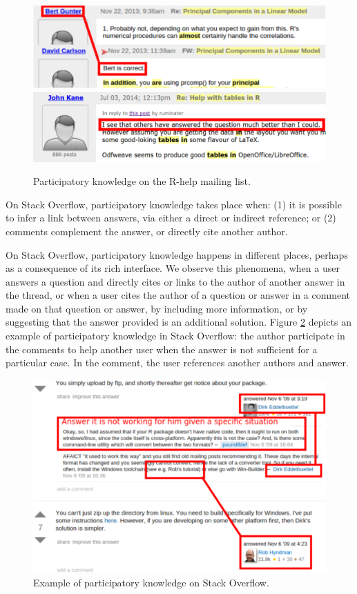 \documentclass{sig-alternate-05-2015}
\begin{document}
	
	\begin{figure}[!htb]
		\centering
		\includegraphics[width=\columnwidth]{Figures/ML-PKimg2}
		\includegraphics[width=\columnwidth]{Figures/ML-PKimg11}
		\caption[Participatory knowledge on the R-help mailing list.]{Participatory knowledge on the R-help mailing list.}
		\label{fig:ML-PK1}
	\end{figure}

	On Stack Overflow, participatory knowledge takes place when:
	(1) it is possible to infer a link between answers, via either a direct or indirect reference; or
	(2) comments complement the answer, or directly cite another author.

	On Stack Overflow, participatory knowledge happens in different places, perhaps as a consequence of its rich interface.
	We observe this phenomena, when a user answers a question and directly cites or links to the author of another answer in the thread, or when a user cites the author of a question or answer in a comment made on that question or answer, by including more information, or by suggesting that the answer provided is an additional solution.
	Figure \ref{fig:SO-PK1} depicts an example of participatory knowledge in Stack Overflow: the author participate in the comments to help another user when the answer is not sufficient for a particular case.
	In the comment, the user references another authors and answer.

	\begin{figure}[!htb]
		\centering
		\includegraphics[width=\columnwidth]{Figures/SO-PKimg5}
		\caption{Example of participatory knowledge on Stack Overflow.}
		\label{fig:SO-PK1}
	\end{figure}
\end{document}
